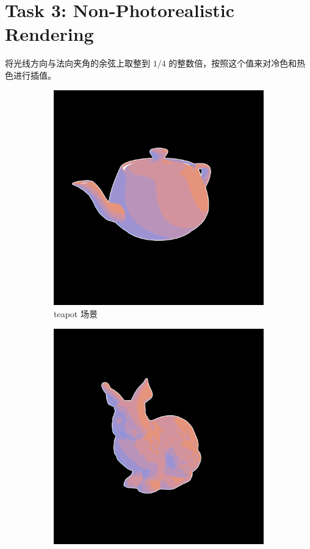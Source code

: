 \documentclass[UTF8]{ctexart}
\begin{document}
\section*{Task 3: Non-Photorealistic Rendering}

将光线方向与法向夹角的余弦上取整到 $1/4$ 的整数倍，按照这个值来对冷色和热色进行插值。

\begin{figure}[htbp]
    \begin{subfigure}[b]{0.49\textwidth}
        \centering
        \includegraphics[width=\textwidth]{images/3-1.png}
        \caption{teapot 场景}
    \end{subfigure}
    \hfill
    \begin{subfigure}[b]{0.49\textwidth}
        \centering
        \includegraphics[width=\textwidth]{images/3-2.png}

\end{subfigure}
\end{figure}
\end{document}
